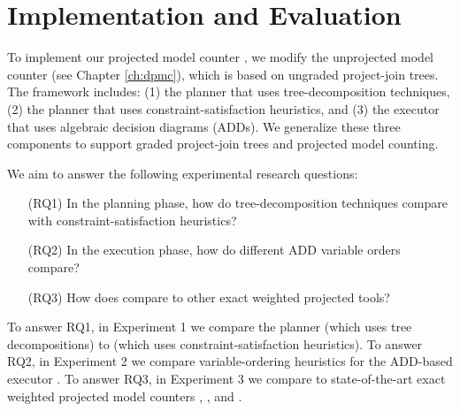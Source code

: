 \section{Implementation and Evaluation}
\label{sec:procount:experiments}

To implement our projected model counter \procount, we modify the unprojected model counter \dpmc{} (see Chapter \ref{ch:dpmc}), which is based on ungraded project-join trees.
The \dpmc{} framework includes: 
(1) the \Lg{} planner that uses tree-decomposition techniques, 
(2) the \htb{} planner that uses constraint-satisfaction heuristics, and
(3) the \dmc{} executor that uses algebraic decision diagrams (ADDs).
We generalize these three components to support graded project-join trees and projected model counting.

We aim to answer the following experimental research questions:
\begin{enumerate}
    \item[(RQ1)] In the planning phase, how do tree-decomposition techniques compare with constraint-satisfaction heuristics?
    \item[(RQ2)] In the execution phase, how do different ADD variable orders compare?
    \item[(RQ3)] How does \procount{} compare to other exact weighted projected tools?
\end{enumerate}

To answer RQ1, in Experiment 1 we compare the planner \Lg{} (which uses tree decompositions) to \htb{} (which uses constraint-satisfaction heuristics). To answer RQ2, in Experiment 2 we compare variable-ordering heuristics for the ADD-based executor \dmc.
To answer RQ3, in Experiment 3 we compare \procount{} to state-of-the-art exact weighted projected model counters \dfp{} \cite{lagniez2019recursive}, \projmc{} \cite{lagniez2019recursive}, and \ssat{} \cite{lee2017solving}.


